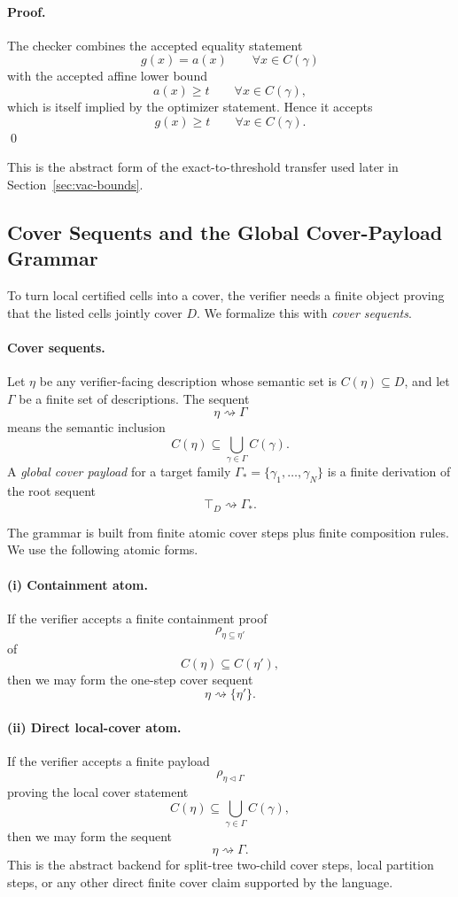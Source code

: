 \paragraph{Proof.}
The checker combines the accepted equality statement
\[
g(x)=a(x)
\qquad \forall x\in C(\gamma)
\]
with the accepted affine lower bound
\[
a(x)\ge t
\qquad \forall x\in C(\gamma),
\]
which is itself implied by the optimizer statement. Hence it accepts
\[
g(x)\ge t
\qquad \forall x\in C(\gamma).
\]
\qed

This is the abstract form of the exact-to-threshold transfer used later in Section~\ref{sec:vac-bounds}.

\subsection{Cover Sequents and the Global Cover-Payload Grammar}

To turn local certified cells into a cover, the verifier needs a finite object proving that the listed cells jointly cover $D$. We formalize this with \emph{cover sequents}.

\paragraph{Cover sequents.}
Let $\eta$ be any verifier-facing description whose semantic set is $C(\eta)\subseteq D$, and let $\Gamma$ be a finite set of descriptions. The sequent
\[
\eta \rightsquigarrow \Gamma
\]
means the semantic inclusion
\[
C(\eta)
\subseteq
\bigcup_{\gamma\in\Gamma} C(\gamma).
\]
A \emph{global cover payload} for a target family $\Gamma_\ast=\{\gamma_1,\dots,\gamma_N\}$ is a finite derivation of the root sequent
\[
\top_D \rightsquigarrow \Gamma_\ast.
\]

The grammar is built from finite atomic cover steps plus finite composition rules. We use the following atomic forms.

\paragraph{(i) Containment atom.}
If the verifier accepts a finite containment proof
\[
\rho_{\eta\subseteq \eta'}
\]
of
\[
C(\eta)\subseteq C(\eta'),
\]
then we may form the one-step cover sequent
\[
\eta \rightsquigarrow \{\eta'\}.
\]

\paragraph{(ii) Direct local-cover atom.}
If the verifier accepts a finite payload
\[
\rho_{\eta\triangleleft \Gamma}
\]
proving the local cover statement
\[
C(\eta)
\subseteq
\bigcup_{\gamma\in\Gamma} C(\gamma),
\]
then we may form the sequent
\[
\eta \rightsquigarrow \Gamma.
\]
This is the abstract backend for split-tree two-child cover steps, local partition steps, or any other direct finite cover claim supported by the language.


